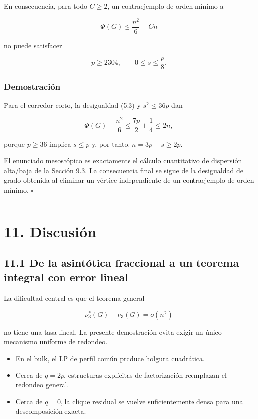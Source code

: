 \documentclass[
  11pt,
]{article}
\providecommand{\tightlist}{%
  \setlength{\itemsep}{0pt}\setlength{\parskip}{0pt}}
\begin{document}
En consecuencia, para todo \(C\ge2\), un contraejemplo de orden mínimo a

\[
\Phi(G)\le\frac{n^2}{6}+Cn
\]

no puede satisfacer

\[
p\ge2304,
\qquad
0\le s\le\frac p8.
\]

\subsubsection{Demostración}\label{demostraciuxf3n-6}

Para el corredor corto, la desigualdad (5.3) y \(s^2\le36p\) dan

\[
\Phi(G)-\frac{n^2}{6}
\le
\frac{7p}{2}+\frac14
\le
2n,
\]

porque \(p\ge36\) implica \(s\le p\) y, por tanto, \(n=3p-s\ge2p\).

El enunciado mesoscópico es exactamente el cálculo cuantitativo de dispersión alta/baja de la Sección 9.3. La consecuencia final se sigue de la desigualdad de grado obtenida al eliminar un vértice independiente de un contraejemplo de orden mínimo. \(\square\)

\begin{center}\rule{0.5\linewidth}{0.5pt}\end{center}

\section{11. Discusión}\label{discusiuxf3n}

\subsection{11.1 De la asintótica fraccional a un teorema integral con error lineal}\label{de-la-asintuxf3tica-fraccional-a-un-teorema-integral-con-error-lineal}

La dificultad central es que el teorema general

\[
\nu_3^*(G)-\nu_3(G)=o(n^2)
\]

no tiene una tasa lineal. La presente demostración evita exigir un único mecanismo uniforme de redondeo.

\begin{itemize}
\tightlist
\item
  En el bulk, el LP de perfil común produce holgura cuadrática.
\item
  Cerca de \(q=2p\), estructuras explícitas de factorización reemplazan el redondeo general.
\item
  Cerca de \(q=0\), la clique residual se vuelve suficientemente densa para una descomposición exacta.
\end{itemize}
\end{document}

